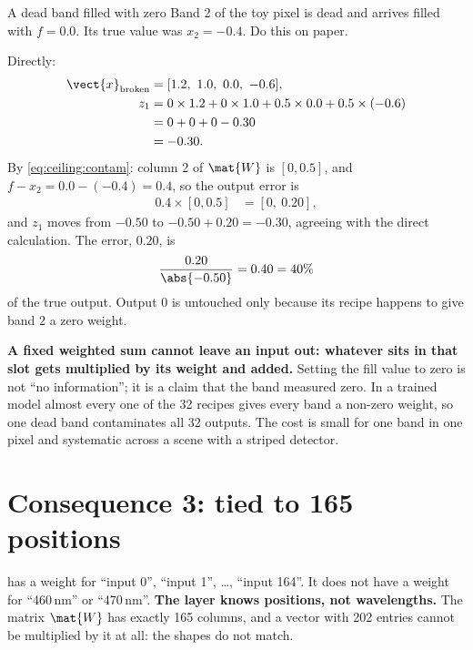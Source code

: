 \begin{worked}[label={we:ceiling:dead}]{A dead band filled with zero}
Band 2 of the toy pixel is dead and arrives filled with $f = 0.0$. Its true value was $x_2 = -0.4$. Do this on paper.

Directly:
\begin{align*}
  \vect{x}_{\text{broken}} &= [1.2,\ 1.0,\ 0.0,\ -0.6],\\
  z_1 &= 0\times1.2 + 0\times1.0 + 0.5\times0.0 + 0.5\times(-0.6)\\
      &= 0 + 0 + 0 - 0.30\\
      &= -0.30 .
\end{align*}
By \cref{eq:ceiling:contam}: column 2 of $\mat{W}$ is $[0, 0.5]$, and $f - x_2 = 0.0 - (-0.4) = 0.4$, so the output error is
\begin{align*}
  0.4 \times [0, 0.5] &= [0,\ 0.20],
\end{align*}
and $z_1$ moves from $-0.50$ to $-0.50 + 0.20 = -0.30$, agreeing with the direct calculation. The error, $0.20$, is
\begin{align*}
  \frac{0.20}{\abs{-0.50}} = 0.40 = 40\%
\end{align*}
of the true output. Output 0 is untouched only because its recipe happens to give band 2 a zero weight.
\end{worked}

\textbf{A fixed weighted sum cannot leave an input out: whatever sits in that slot gets multiplied by its weight and added.} Setting the fill value to zero is not ``no information''; it is a claim that the band measured zero. In a trained model almost every one of the 32 recipes gives every band a non-zero weight, so one dead band contaminates all 32 outputs. The cost is small for one band in one pixel and systematic across a scene with a striped detector.

\section{Consequence 3: tied to 165 positions}\label{sec:ceiling:positions}

 has a weight for ``input 0'', ``input 1'', \ldots, ``input 164''. It does not have a weight for ``460\,nm'' or ``470\,nm''. \textbf{The layer knows positions, not wavelengths.} The matrix $\mat{W}$ has exactly 165 columns, and a vector with 202 entries cannot be multiplied by it at all: the shapes do not match.

